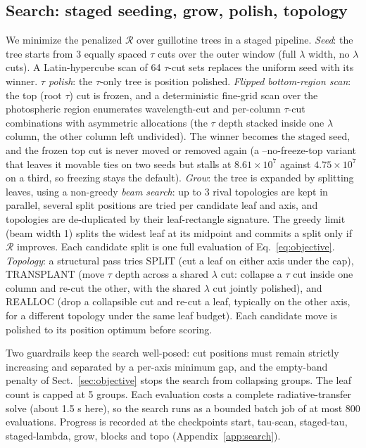 \documentclass{aa}
\begin{document}
\subsection{Search: staged seeding, grow, polish, topology}
\label{sec:search}

   We minimize the penalized $\mathcal{R}$ over guillotine trees in a
   staged pipeline. \emph{Seed}: the tree starts from 3 equally spaced
   $\tau$ cuts over the outer window (full $\lambda$ width, no
   $\lambda$ cuts). A Latin-hypercube scan of 64 $\tau$-cut sets
   replaces the uniform seed with its winner. \emph{$\tau$ polish}: the
   $\tau$-only tree is position polished. \emph{Flipped bottom-region
   scan}: the top (root $\tau$) cut is frozen, and a deterministic
   fine-grid scan over the photospheric region enumerates
   wavelength-cut and per-column $\tau$-cut combinations with asymmetric
   allocations (the $\tau$ depth stacked inside one $\lambda$ column,
   the other column left undivided). The winner becomes the staged
   seed, and the frozen top cut is never moved or removed again (a
   --no-freeze-top variant that leaves it movable ties on two seeds but
   stalls at $8.61\times10^{7}$ against $4.75\times10^{7}$ on a third,
   so freezing stays the default).
   \emph{Grow}: the tree is expanded by splitting leaves, using a
   non-greedy \emph{beam search}: up to 3 rival topologies are
   kept in parallel, several split positions are tried per candidate leaf
   and axis, and topologies are de-duplicated by their leaf-rectangle
   signature. The greedy limit (beam width 1) splits the widest leaf at
   its midpoint and commits a split only if $\mathcal{R}$ improves. Each
   candidate split is one full evaluation of Eq.~\ref{eq:objective}.
   \emph{Topology}: a structural pass tries SPLIT (cut a leaf on either
   axis under the cap), TRANSPLANT (move $\tau$ depth across a shared
   $\lambda$ cut: collapse a $\tau$ cut inside one column and re-cut the
   other, with the shared $\lambda$ cut jointly polished), and REALLOC
   (drop a collapsible cut and re-cut a leaf, typically on the other
   axis, for a different topology under the same leaf budget). Each
   candidate move is polished to its position optimum before scoring.

   Two guardrails keep the search well-posed: cut positions must remain
   strictly increasing and separated by a per-axis minimum gap, and the
   empty-band penalty of Sect.~\ref{sec:objective} stops the search from
   collapsing groups. The leaf count is capped at 5 groups. Each
   evaluation costs a complete radiative-transfer solve (about 1.5 s
   here), so the search runs as a bounded batch job of at most 800
   evaluations. Progress is recorded at the checkpoints start,
   tau-scan, staged-tau, staged-lambda, grow, blocks and topo
   (Appendix~\ref{app:search}).
\end{document}
